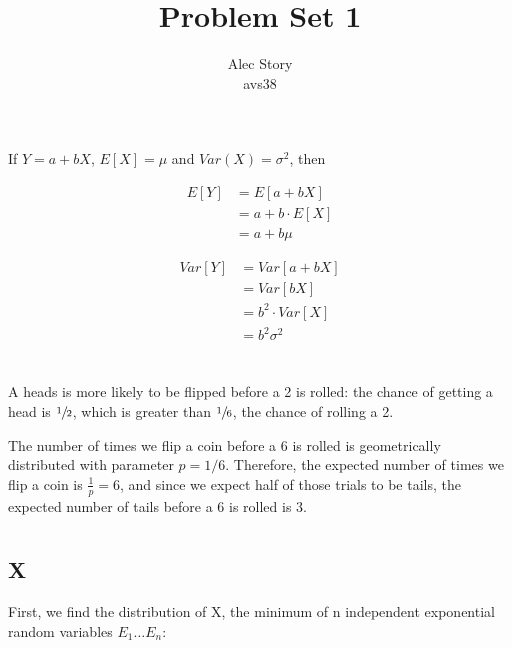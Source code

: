 \documentclass{article}
\title{Problem Set 1}
\author{Alec Story \\ \small{avs38}}
\begin{document}
\maketitle

\section{}

    If $Y = a + bX$, $E[X] = \mu $ and $Var(X) = \sigma^2$, then 

    \begin{align*}
        E[Y] &= E[a + bX] \\
             &= a + b \cdot E[X] \\
             &= a + b\mu
    \end{align*}

    \begin{align*}
        Var[Y] &= Var[a + bX] \\
               &= Var[bX] \\
               &= b^2 \cdot Var[X] \\
               &= b^2 \sigma^2
    \end{align*}

\section{}

A heads is more likely to be flipped before a 2 is rolled:  the chance of
getting a head is $\sfrac{1}{2}$, which is greater than $\sfrac{1}{6}$, the
chance of rolling a 2.

The number of times we flip a coin before a 6 is rolled is geometrically
distributed with parameter $p = 1/6$.  Therefore, the expected number of times
we flip a coin is $\frac{1}{p} = 6$, and since we expect half of those trials to
be tails, the expected number of tails before a 6 is rolled is 3.

\section{}

    \subsection*{X}

    First, we find the distribution of X, the minimum of n independent
    exponential random variables $E_1 \dots E_n$:
\end{document}

